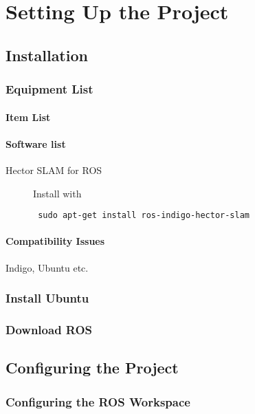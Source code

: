 \chapter{Setting Up the Project}

\section{Installation}

\subsection{Equipment List}

\subsubsection{Item List}

\subsubsection{Software list}

\begin{description}
	\item[Hector SLAM for ROS] Install with \begin{verbatim} sudo apt-get install ros-indigo-hector-slam 
\end{verbatim}
\end{description}

\subsubsection{Compatibility Issues}

Indigo, Ubuntu etc.

\subsection{Install Ubuntu}

\subsection{Download ROS}

\section{Configuring the Project}

\subsection{Configuring the ROS Workspace}

